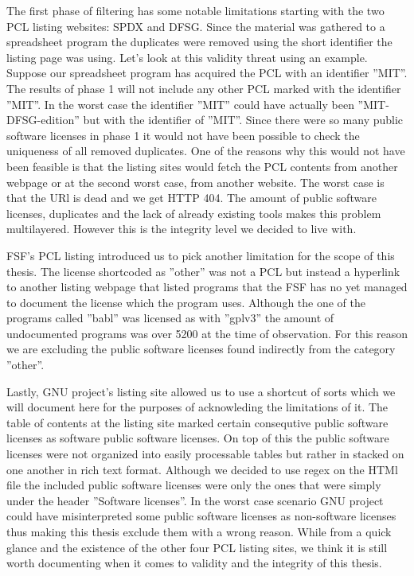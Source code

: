 The first phase of filtering has some notable limitations starting with the two PCL listing websites: SPDX and DFSG. Since the material was gathered to a spreadsheet program the duplicates were removed using the short identifier the listing page was using. Let's look at this validity threat using an example. Suppose our spreadsheet program has acquired the PCL with an identifier ''MIT''. The results of phase 1 will not include any other PCL marked with the identifier ''MIT''. In the worst case the identifier ''MIT'' could have actually been ''MIT-DFSG-edition'' but with the identifier of ''MIT''. Since there were so many public software licenses in phase 1 it would not have been possible to check the uniqueness of all removed duplicates. One of the reasons why this would not have been feasible is that the listing sites would fetch the PCL contents from another webpage or at the second worst case, from another website. The worst case is that the URl is dead and we get HTTP 404. The amount of public software licenses, duplicates and the lack of already existing tools makes this problem multilayered. However this is the integrity level we decided to live with.

FSF's PCL listing introduced us to pick another limitation for the scope of this thesis. The license shortcoded as ''other'' was not a PCL but instead a hyperlink to another listing webpage that listed programs that the FSF has no yet managed to document the license which the program uses. Although the one of the programs called ''babl'' was licensed as with ''gplv3'' the amount of undocumented programs was over 5200 at the time of observation. For this reason we are excluding the public software licenses found indirectly from the category ''other''.

Lastly, GNU project's listing site allowed us to use a shortcut of sorts which we will document here for the purposes of acknowleding the limitations of it. The table of contents at the listing site marked certain consequtive public software licenses as software public software licenses. On top of this the public software licenses were not organized into easily processable tables but rather in stacked on one another in rich text format. Although we decided to use regex on the HTMl file the included public software licenses were only the ones that were simply under the header ''Software licenses''. In the worst case scenario GNU project could have misinterpreted some public software licenses as non-software licenses thus making this thesis exclude them with a wrong reason. While from a quick glance and the existence of the other four PCL listing sites, we think it is still worth documenting when it comes to validity and the integrity of this thesis.

